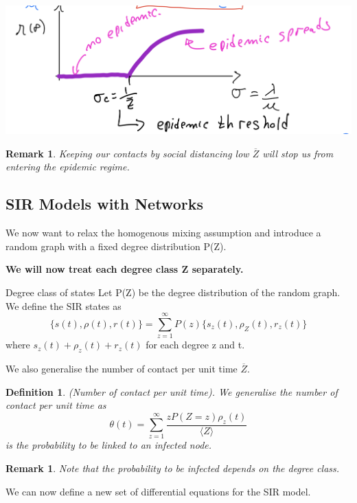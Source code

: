 \documentclass[twoside]{article}
\newtheorem{definition}[theorem]{Definition}
\newtheorem{remark}[theorem]{Remark}
\begin{document}
\begin{center}
\includegraphics[scale=0.4]{epidemic-threshold}
\end{center}

\begin{remark}Keeping our contacts by social distancing low $\overline{Z}$ will stop us from entering the epidemic regime.
\end{remark}

\subsection{SIR Models with Networks}

We now want to relax the homogenous mixing assumption and introduce a random graph with a fixed degree distribution P(Z). 

\textbf{We will now treat each degree class Z separately.}

\begin{definition_exam}{Degree class of states}{} Let P(Z) be the degree distribution of the random graph. We define the SIR states as 
$$
\{s(t), \rho(t), r(t)\} = \sum_{z=1}^{\infty}P(z)\{s_z(t), \rho_Z(t), r_z(t) \}
$$
where $s_z(t) + \rho_z(t) + r_z(t)$ for each degree z and t.
\end{definition_exam}

We also generalise the number of contact per unit time $\overline{Z}.$

\begin{definition}(Number of contact per unit time). We generalise the number of contact per unit time as 
$$
\theta(t) = \sum_{z=1}^{\infty}\frac{zP(Z=z)\rho_z(t)}{\langle Z \rangle}
$$
is the probability to be linked to an infected node.
\end{definition}

\begin{remark} Note that the probability to be infected depends on the degree class.
\end{remark}

We can now define a new set of differential equations for the SIR model.
\end{document}
